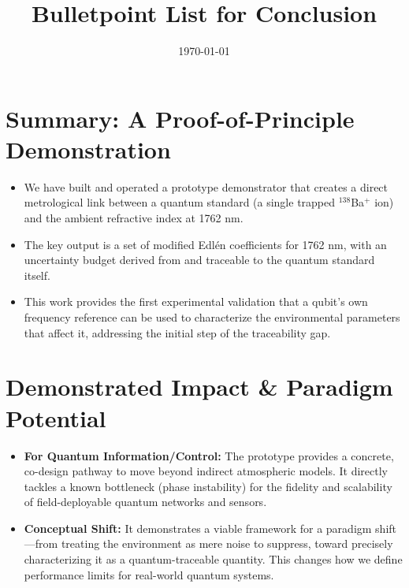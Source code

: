 \documentclass[aip,reprint,groupedaddress,onecolumn,superscriptaddress]{revtex4-2}
\begin{document}
\title{Bulletpoint List for Conclusion}
\date{\today}

\maketitle

\section{Summary: A Proof-of-Principle Demonstration}
\begin{itemize}
    \item We have built and operated a prototype demonstrator that creates a direct metrological link between a quantum standard (a single trapped $^{138}$Ba$^+$ ion) and the ambient refractive index at 1762 nm.
    \item The key output is a set of modified Edlén coefficients for 1762 nm, with an uncertainty budget derived from and traceable to the quantum standard itself.
    \item This work provides the first experimental validation that a qubit's own frequency reference can be used to characterize the environmental parameters that affect it, addressing the initial step of the traceability gap.
\end{itemize}

\section{Demonstrated Impact \& Paradigm Potential}
\begin{itemize}
    \item \textbf{For Quantum Information/Control:} The prototype provides a concrete, co-design pathway to move beyond indirect atmospheric models. It directly tackles a known bottleneck (phase instability) for the fidelity and scalability of field-deployable quantum networks and sensors.
    \item \textbf{Conceptual Shift:} It demonstrates a viable framework for a paradigm shift—from treating the environment as mere noise to suppress, toward precisely characterizing it as a quantum-traceable quantity. This changes how we define performance limits for real-world quantum systems.
\end{itemize}
\end{document}
